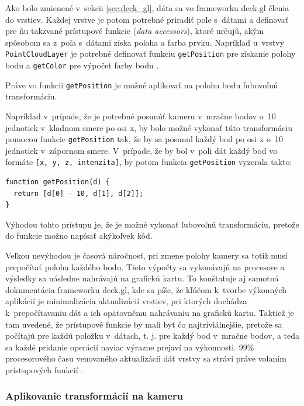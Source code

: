 Ako bolo zmienené v~sekcii \ref{sec:deck_gl}, dáta sa vo frameworku deck.gl členia do vrstiev. Každej vrstve je potom potrebné priradiť pole s~dátami a definovať pre ňu takzvané prístupové funkcie (\emph{data accessors}), ktoré určujú, akým spôsobom sa z~poľa s~dátami získa poloha a farba prvku. Napríklad u~vrstvy \texttt{PointCloudLayer} je potrebné definovať funkciu \texttt{getPosition} pre získanie polohy bodu a \texttt{getColor} pre výpočet farby bodu \cite{deck.gl_documentation}.

Práve vo funkcii \texttt{getPosition} je možné aplikovať na polohu bodu ľubovoľnú transformáciu.

Napríklad v~prípade, že je potrebné posunúť kameru v~mračne bodov o~10 jednotiek v~kladnom smere po osi x, by bolo možné vykonať túto transformáciu pomocou funkcie \texttt{getPosition} tak, že by sa posunul každý bod po osi x o~10 jednotiek v~zápornom smere. V~prípade, že by bol v~poli dát každý bod vo formáte \texttt{[x, y, z, intenzita]}, by potom funkcia \texttt{getPosition} vyzerala takto:

\begin{lstlisting}
function getPosition(d) {
  return [d[0] - 10, d[1], d[2]];
}
\end{lstlisting}

Výhodou tohto prístupu je, že je možné vykonať ľubovoľnú transformáciu, pretože do funkcie možno napísať akýkoľvek kód.

Veľkou nevýhodou je časová náročnosť, pri zmene polohy kamery sa totiž musí prepočítať poloha každého bodu. Tieto výpočty sa vykonávajú na procesore a výsledky sa následne nahrávajú na grafickú kartu. To konštatuje aj samotná dokumentácia frameworku deck.gl, kde sa píše, že kľúčom k~tvorbe výkonných aplikácií je minimalizácia aktualizácií vrstiev, pri ktorých dochádza k~prepočítavaniu dát a ich opätovnému nahrávaniu na grafickú kartu. Taktiež je tam uvedené, že prístupové funkcie by mali byť čo najtriviálnejšie, pretože sa počítajú pre každú položku v~dátach, t. j. pre každý bod v~mračne bodov, a teda sa každé pridanie operácií naviac výrazne prejaví na výkonnosti. 99\% procesorového času venovaného aktualizácii dát vrstvy sa strávi práve volaním prístupových funkcií \cite{deck.gl_performance_optimization}.

\subsubsection{Aplikovanie transformácií na kameru}

